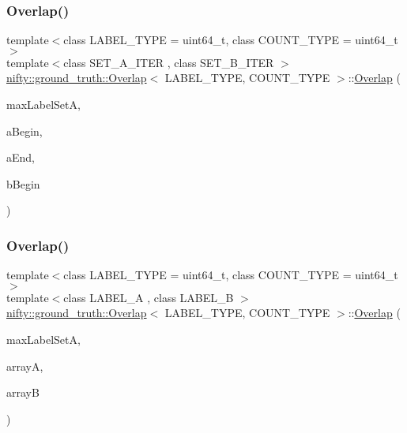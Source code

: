 \subsubsection{\texorpdfstring{Overlap()}{Overlap()}\hspace{0.1cm}{\footnotesize\ttfamily [1/2]}}
{\footnotesize\ttfamily template$<$class L\+A\+B\+E\+L\+\_\+\+T\+Y\+PE  = uint64\+\_\+t, class C\+O\+U\+N\+T\+\_\+\+T\+Y\+PE  = uint64\+\_\+t$>$ \\
template$<$class S\+E\+T\+\_\+\+A\+\_\+\+I\+T\+ER , class S\+E\+T\+\_\+\+B\+\_\+\+I\+T\+ER $>$ \\
\hyperlink{classnifty_1_1ground__truth_1_1Overlap}{nifty\+::ground\+\_\+truth\+::\+Overlap}$<$ L\+A\+B\+E\+L\+\_\+\+T\+Y\+PE, C\+O\+U\+N\+T\+\_\+\+T\+Y\+PE $>$\+::\hyperlink{classnifty_1_1ground__truth_1_1Overlap}{Overlap} (\begin{DoxyParamCaption}\item[{const uint64\+\_\+t}]{max\+Label\+SetA,  }\item[{S\+E\+T\+\_\+\+A\+\_\+\+I\+T\+ER}]{a\+Begin,  }\item[{S\+E\+T\+\_\+\+A\+\_\+\+I\+T\+ER}]{a\+End,  }\item[{S\+E\+T\+\_\+\+B\+\_\+\+I\+T\+ER}]{b\+Begin }\end{DoxyParamCaption})\hspace{0.3cm}{\ttfamily [inline]}}

\mbox{\label{classnifty_1_1ground__truth_1_1Overlap_a0a40f259581e8a4d9e594fd1db23170a}} 
\subsubsection{\texorpdfstring{Overlap()}{Overlap()}\hspace{0.1cm}{\footnotesize\ttfamily [2/2]}}
{\footnotesize\ttfamily template$<$class L\+A\+B\+E\+L\+\_\+\+T\+Y\+PE  = uint64\+\_\+t, class C\+O\+U\+N\+T\+\_\+\+T\+Y\+PE  = uint64\+\_\+t$>$ \\
template$<$class L\+A\+B\+E\+L\+\_\+A , class L\+A\+B\+E\+L\+\_\+B $>$ \\
\hyperlink{classnifty_1_1ground__truth_1_1Overlap}{nifty\+::ground\+\_\+truth\+::\+Overlap}$<$ L\+A\+B\+E\+L\+\_\+\+T\+Y\+PE, C\+O\+U\+N\+T\+\_\+\+T\+Y\+PE $>$\+::\hyperlink{classnifty_1_1ground__truth_1_1Overlap}{Overlap} (\begin{DoxyParamCaption}\item[{const uint64\+\_\+t}]{max\+Label\+SetA,  }\item[{const \hyperlink{classandres_1_1View}{marray\+::\+View}$<$ L\+A\+B\+E\+L\+\_\+A $>$}]{arrayA,  }\item[{const \hyperlink{classandres_1_1View}{marray\+::\+View}$<$ L\+A\+B\+E\+L\+\_\+B $>$}]{arrayB }\end{DoxyParamCaption})\hspace{0.3cm}{\ttfamily [inline]}}



